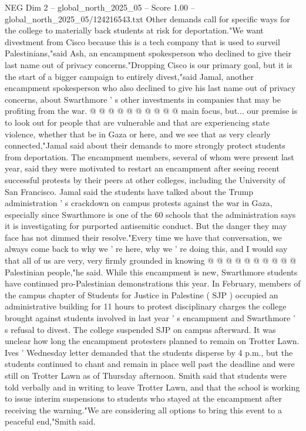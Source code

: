 \begin{textsample}{NEG Dim 2 – global\_north\_2025\_05 – Score 1.00 – global\_north\_2025\_05/124216543.txt}
Other demands call for specific ways for the college to materially back students at risk for deportation."We want divestment from Cisco because this is a tech company that is used to surveil Palestinians,"said Ash, an encampment spokesperson who declined to give their last name out of privacy concerns."Dropping Cisco is our primary goal, but it is the start of a bigger campaign to entirely divest,"said Jamal, another encampment spokesperson who also declined to give his last name out of privacy concerns, about Swarthmore ' s other investments in companies that may be profiting from the war. @ @ @ @ @ @ @ @ @ @ main focus, but... our premise is to look out for people that are vulnerable and that are experiencing state violence, whether that be in Gaza or here, and we see that as very clearly connected,"Jamal said about their demands to more strongly protect students from deportation.
The encampment members, several of whom were present last year, said they were motivated to restart an encampment after seeing recent successful protests by their peers at other colleges, including the University of San Francisco.
Jamal said the students have talked about the Trump administration ' s crackdown on campus protests against the war in Gaza, especially since Swarthmore is one of the 60 schools that the administration says it is investigating for purported antisemitic conduct.
But the danger they may face has not dimmed their resolve."Every time we have that conversation, we always come back to why we ' re here, why we ' re doing this, and I would say that all of us are very, very firmly grounded in knowing @ @ @ @ @ @ @ @ @ @ Palestinian people,"he said.
While this encampment is new, Swarthmore students have continued pro-Palestinian demonstrations this year.
In February, members of the campus chapter of Students for Justice in Palestine ( SJP ) occupied an administrative building for 11 hours to protest disciplinary charges the college brought against students involved in last year ' s encampment and Swarthmore ' s refusal to divest.
The college suspended SJP on campus afterward.
It was unclear how long the encampment protesters planned to remain on Trotter Lawn.
Ives ' Wednesday letter demanded that the students disperse by 4 p.m., but the students continued to chant and remain in place well past the deadline and were still on Trotter Lawn as of Thursday afternoon.
Smith said that students were told verbally and in writing to leave Trotter Lawn, and that the school is working to issue interim suspensions to students who stayed at the encampment after receiving the warning."We are considering all options to bring this event to a peaceful end,"Smith said.

\end{textsample}
